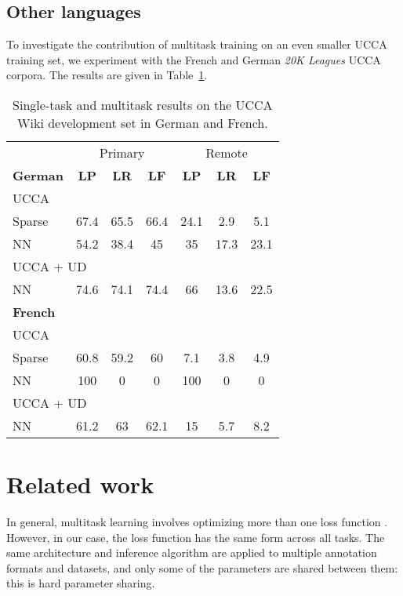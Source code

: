 \documentclass[11pt,a4paper]{article}
\begin{document}
\subsection{Other languages}\label{sec:other_languages}

To investigate the contribution of multitask training on an even smaller UCCA training set,
we experiment with the French and German \textit{20K Leagues} UCCA corpora.
The results are given in Table~\ref{tab:other_languages}.

\begin{table}
\begin{tabular}{lccc|ccc}
& \multicolumn{3}{c|}{Primary} & \multicolumn{3}{c}{Remote} \\
\textbf{German} & \textbf{LP} & \textbf{LR} & \textbf{LF} & \textbf{LP} & \textbf{LR} & \textbf{LF} \\
UCCA \\
\small Sparse & 67.4 & 65.5 & 66.4 & 24.1 & 2.9 & 5.1 \\
\small NN & 54.2 & 38.4 & 45 & 35 & 17.3 & 23.1 \\
\multicolumn{3}{l}{UCCA + UD} \\
\small NN & 74.6 & 74.1 & 74.4 & 66 & 13.6 & 22.5 \\
\hline
\textbf{French} \\
UCCA \\
\small Sparse & 60.8 & 59.2 & 60 & 7.1 & 3.8 & 4.9 \\
\small NN & 100 & 0 & 0 & 100 & 0 & 0 \\
\multicolumn{3}{l}{UCCA + UD} \\
\small NN & 61.2 & 63 & 62.1 & 15 & 5.7 & 8.2
\end{tabular}
\caption{Single-task and multitask results on the UCCA Wiki development set in German and French.\label{tab:other_languages}}
\end{table}



\section{Related work}\label{sec:related_work}

In general, multitask learning involves optimizing more than one loss function \cite{ruder2017overview}.
However, in our case, the loss function has the same form across all tasks.
The same architecture and inference algorithm are applied to multiple annotation formats and datasets,
and only some of the parameters are shared between them: this is hard parameter sharing.
\end{document}
